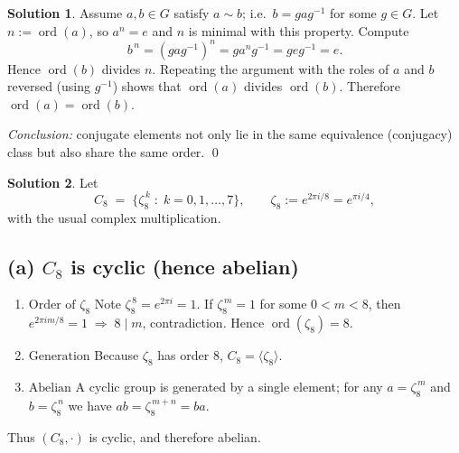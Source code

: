 \documentclass[12pt]{article}
\theoremstyle{definition} %
\newtheorem{solution}{Solution}
\theoremstyle{plain} %
\begin{document}
\begin{solution}
    Assume $a,b\in G$ satisfy $a\sim b$; i.e.\ $b=gag^{-1}$ for some $g\in G$.
    Let $n:=\operatorname{ord}(a)$, so $a^{n}=e$ and $n$ is minimal with this property.
    Compute
    \[
          b^{\,n}
          = (gag^{-1})^{n}
          = g a^{n} g^{-1}
          = g e g^{-1}
          = e.
    \]
    Hence $\operatorname{ord}(b)$ divides $n$.  
    Repeating the argument with the roles of $a$ and $b$ reversed (using $g^{-1}$)
    shows that $\operatorname{ord}(a)$ divides $\operatorname{ord}(b)$.  
    Therefore $\operatorname{ord}(a)=\operatorname{ord}(b)$.
    
    \bigskip
    \noindent
    \textit{Conclusion:} conjugate elements not only lie in the same equivalence (conjugacy) class but also share the same order.
    \qed
    \end{solution}
    \begin{solution}
      \makeatletter{}\makeatother
      Let  
      \[
          C_{8}\;=\;\bigl\{\zeta_{8}^{\,k}\;:\;k=0,1,\dots,7\bigr\},
          \qquad
          \zeta_{8}:=e^{2\pi i/8}=e^{\pi i/4},
      \]
      with the usual complex multiplication.
      
      \subsection*{(a)  $C_{8}$ is cyclic (hence abelian)}
      
      \begin{enumerate}
          \item $\boxed{\text{Order of }\zeta_{8}}$  
                Note $\zeta_{8}^{\,8}=e^{2\pi i}=1$.  
                If $\zeta_{8}^{\,m}=1$ for some $0<m<8$, then
                $e^{2\pi i m/8}=1\;\Longrightarrow\;8\mid m$, contradiction.
                Hence $\operatorname{ord}(\zeta_{8})=8$.
      
          \item $\boxed{\text{Generation}}$  
                Because $\zeta_{8}$ has order $8$, 
                \(
                    C_{8}=\langle\zeta_{8}\rangle.
                \)
      
          \item $\boxed{\text{Abelian}}$  
                A cyclic group is generated by a single element;
                for any $a=\zeta_{8}^{\,m}$ and $b=\zeta_{8}^{\,n}$
                we have $ab=\zeta_{8}^{\,m+n}=ba$.
      \end{enumerate}
      Thus $(C_{8},\cdot)$ is cyclic, and therefore abelian.
      

\end{solution}
\end{document}
